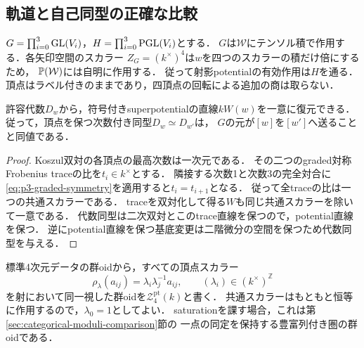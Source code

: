 \subsection{軌道と自己同型の正確な比較}

$G=\prod_{i=0}^3\mathrm{GL}(V_i)$，$H=\prod_{i=0}^3\mathrm{PGL}(V_i)$とする．
$G$は$\mathcal W$にテンソル積で作用する．各矢印空間のスカラー
$Z_G=(k^\times)^4$は$w$を四つのスカラーの積だけ倍にするため，
$\mathbb P(\mathcal W)$には自明に作用する．
従って射影potentialの有効作用は$H$を通る．
頂点はラベル付きのままであり，四頂点の回転による追加の商は取らない．

\begin{lemma}[potential直線の一意性]
\label{lem:p3-potential-unique}
許容代数$D_w$から，符号付きsuperpotentialの直線$kW(w)$を一意に復元できる．
従って，頂点を保つ次数付き同型$D_w\simeq D_{w'}$は，
$G$の元が$[w]$を$[w']$へ送ることと同値である．
\end{lemma}
\begin{proof}
Koszul双対の各頂点の最高次数は一次元である．
その二つのgraded対称Frobenius traceの比を$t_i\in k^\times$とする．
隣接する次数1と次数3の完全対合に
\eqref{eq:p3-graded-symmetry}を適用すると$t_i=t_{i+1}$となる．
従って全traceの比は一つの共通スカラーである．
traceを双対化して得る$W$も同じ共通スカラーを除いて一意である．
代数同型は二次双対とこのtrace直線を保つので，potential直線を保つ．
逆にpotential直線を保つ基底変更は二階微分の空間を保つため代数同型を与える．
\end{proof}

標準4次元データの群oidから，すべての頂点スカラー
\[
 \rho_\lambda(a_{ij})=\lambda_i\lambda_j^{-1}a_{ij},
 \qquad(\lambda_i)\in(k^\times)^{\mathbb Z}
\]
を射において同一視した群oidを$\mathcal Z_4^{\mathrm{pt}}(k)$と書く．
共通スカラーはもともと恒等に作用するので，$\lambda_0=1$としてよい．
saturationを課す場合，これは第\ref{sec:categorical-moduli-comparison}節の
一点の同定を保持する豊富列付き圏の群oidである．

